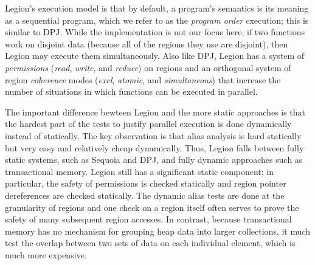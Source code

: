 Legion's execution model is that by default, a program's semantics is
its meaning as a sequential program, which we refer to as the {\em
program order} execution; this is similar to DPJ.  While the
implementation is not our focus here, if two functions work on
disjoint data (because all of the regions they use are disjoint), then
Legion may execute them simultaneously.  Also like DPJ,
Legion has a system of {\em permissions} ({\em read}, {\em write}, and
{\em reduce}) on regions and an orthogonal system of region {\em
coherence} modes ({\em excl}, {\em atomic}, and {\em simultaneous})
that increase the number of situations in which functions can be
executed in parallel.

The important difference bewteen Legion and the more static approaches
is that the hardest part of the tests to justify parallel execution is
done dynamically instead of statically.  The key observation is that
alias analysis is hard statically but very easy and relatively cheap
dynamically.  Thus, Legion falls between fully static systems, such as
Sequoia and DPJ, and fully dynamic approaches such as transactional
memory.  Legion still has a significant static component; in
particular, the safety of permissions is checked statically and region
pointer dereferences are checked statically.  The dynamic alias tests
are done at the granularity of regions and one check on a region
itself often serves to prove the safety of many subsequent region
accesses.  In contrast, because transactional memory has no mechanism
for grouping heap data into larger collections, it much test the
overlap between two sets of data on each individual element, which is
much more expensive.


